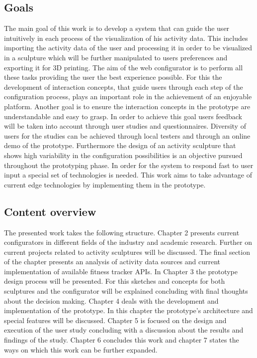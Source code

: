 \documentclass[../medieninformatik-arbeit.tex]{subfiles}
\begin{document}
\subsection{Goals}
The main goal of this work is to develop a system that can guide the user intuitively in each process of the visualization of his activity data. This
includes importing the activity data of the user and processing it in order to be
visualized in a sculpture which will be further manipulated to users preferences
and exporting it for 3D printing. The aim of the web configurator is to perform all
these tasks providing the user the best experience possible. For this the development 
of interaction concepts, that guide users through each step of the configuration
process, plays an important role in the achievement of an enjoyable platform.
Another goal is to ensure the interaction concepts in the prototype are
understandable and easy to grasp. In order to achieve this goal users feedback
will be taken into account through user studies and questionnaires. Diversity of
users for the studies can be achieved through local testers and through
an online demo of the prototype. Furthermore the design of an activity sculpture that shows
high variability in the configuration possibilities is an objective pursued
throughout the prototyping phase. In order for the system to respond fast to
user input a special set of technologies is needed. This work aims to take advantage of
current edge technologies by implementing them in the prototype. 


\subsection{Content overview}
The presented work takes the following structure. Chapter 2 presents current
configurators in different fields of the industry and academic research. Further
on current projects related to activity sculptures will be discussed. The final
section of the chapter presents an analysis of activity data sources
and current implementation of available fitness tracker APIs. In Chapter 3 the
prototype design process will be presented. For this sketches and concepts for
both sculptures and the configurator will be explained concluding with final
thoughts about the decision making. Chapter 4 deals with the development
and implementation of the prototype. In this chapter the prototype's architecture and
special features will be discussed. Chapter 5 is focused on the design and
execution of the user study concluding with a discussion about the results and
findings of the study. Chapter 6 concludes this work and chapter 7 states the
ways on which this work can be further expanded.
\end{document}
